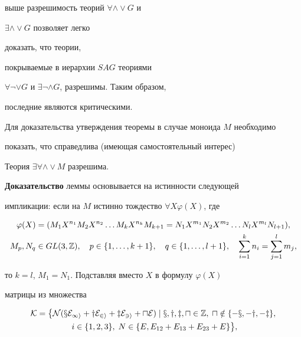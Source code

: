 выше разрешимость теорий $\forall\wedge\vee G$ и 


$\exists\wedge\vee G$ позволяет легко 


доказать, что теории, 


покрываемые в иерархии $SAG$ теориями 


$\forall\neg\vee G$ и $\exists\neg\wedge G$, разрешимы. Таким образом, 


последние являются критическими. 


 


Для доказательства утверждения теоремы в случае моноида $M$ необходимо 


показать, что справедлива (имеющая самостоятельный интерес) 


 


\begin{lemnonum} 


Теория $\exists\forall\wedge\vee M$ разрешима. 


\end{lemnonum} 


 


{\bf Доказательство} леммы основывается на истинности следующей 


импликации: если на $M$ истинно тождество $\forall X\varphi(X)$, где 


\begin{gather*} 


\varphi(X)=(M_1X^{n_1}M_2X^{n_2}\dotsc M_k X^{n_k}M_{k+1}= 


N_1 X^{m_1}N_2 X^{m_2}\dotsc N_l X^{m_l}N_{l+1}), \\ 


%


M_p,N_q\in GL(3,\Bbb Z),\quad p\in\{1,\dotsc,k+1\},\quad 


q\in\{1,\dotsc,l+1\},\quad \sum^k_{i=1}n_i=\sum^l_{j=1}m_j, 


\end{gather*} 


то $k=l$, $M_1=N_1$. Подставляя вместо $X$ в формулу $\varphi(X)$ 


матрицы из множества 


\begin{multline*} 


\cal K=\big\{N(x E_{1i}+y E_{2i}+z E_{3i}+uE)\mid 


x,y,z,u\in\Bbb Z,\;u\notin\{-x,-y,-z\},\\\


i\in\{1,2,3\},\;N\in\{E,E_{12}+E_{13}+E_{23}+E\}\big\}, 


\end{multline*}  


